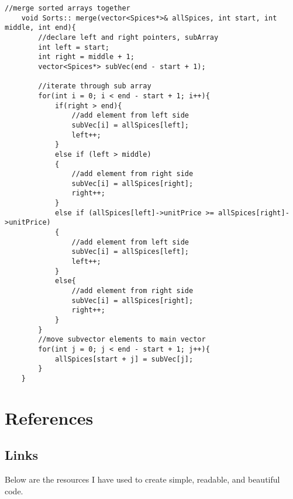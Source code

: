 \documentclass[letterpaper, 10pt,DIV=13]{scrartcl}
\numberwithin{equation}{section} %
\numberwithin{figure}{section} %
\numberwithin{table}{section} %
\begin{document}
\begin{lstlisting}[frame=single, ]
    //merge sorted arrays together
    void Sorts:: merge(vector<Spices*>& allSpices, int start, int middle, int end){
        //declare left and right pointers, subArray
        int left = start;
        int right = middle + 1;
        vector<Spices*> subVec(end - start + 1);
    
        //iterate through sub array
        for(int i = 0; i < end - start + 1; i++){
            if(right > end){
                //add element from left side
                subVec[i] = allSpices[left];
                left++;
            }
            else if (left > middle)
            {
                //add element from right side
                subVec[i] = allSpices[right];
                right++;
            }
            else if (allSpices[left]->unitPrice >= allSpices[right]->unitPrice)
            {
                //add element from left side
                subVec[i] = allSpices[left];
                left++;
            }
            else{
                //add element from right side
                subVec[i] = allSpices[right];
                right++;
            }
        }
        //move subvector elements to main vector
        for(int j = 0; j < end - start + 1; j++){
            allSpices[start + j] = subVec[j];
        }
    }
    \end{lstlisting}
\pagebreak

\section{References}

\subsection{Links}
Below are the resources I have used to create simple, readable, and beautiful code.
\end{document}
